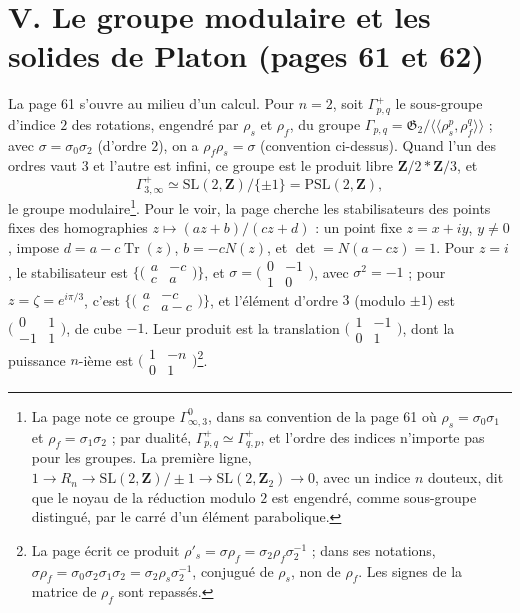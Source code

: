 \documentclass[11pt,a4paper]{article}
\begin{document}
\section*{V. Le groupe modulaire et les solides de Platon (pages 61 et 62)}

La page 61 s'ouvre au milieu d'un calcul. Pour $n = 2$, soit $\Gamma^+_{p,q}$
le sous-groupe d'indice $2$ des rotations, engendré par $\rho_s$ et $\rho_f$, du
groupe $\Gamma_{p,q} = \mathfrak{G}_2 / \langle\langle \rho_s^p, \rho_f^q
\rangle\rangle$ ; avec $\sigma = \sigma_0\sigma_2$ (d'ordre $2$), on a $\rho_f\rho_s
= \sigma$ (convention ci-dessus). Quand l'un des ordres vaut $3$ et l'autre est
infini, ce groupe est le produit libre $\mathbf{Z}/2 * \mathbf{Z}/3$, et
\[
\Gamma^+_{3,\infty} \simeq \mathrm{SL}(2, \mathbf{Z}) / \{\pm 1\} =
\mathrm{PSL}(2, \mathbf{Z}),
\]
le groupe modulaire\footnote{La page note ce groupe $\Gamma^0_{\infty,3}$, dans
sa convention de la page 61 où $\rho_s = \sigma_0\sigma_1$ et $\rho_f =
\sigma_1\sigma_2$ ; par dualité, $\Gamma^+_{p,q} \simeq \Gamma^+_{q,p}$, et l'ordre
des indices n'importe pas pour les groupes. La première ligne, $1 \to R_n \to
\mathrm{SL}(2, \mathbf{Z})/\pm 1 \to \mathrm{SL}(2, \mathbf{Z}_2) \to 0$, avec un
indice $n$ douteux, dit que le noyau de la réduction modulo $2$ est engendré,
comme sous-groupe distingué, par le carré d'un élément parabolique.}. Pour le
voir, la page cherche les stabilisateurs des points fixes des homographies
$z \mapsto (az + b)/(cz + d)$ : un point fixe $z = x + iy$, $y \neq 0$, impose
$d = a - c\operatorname{Tr}(z)$, $b = -cN(z)$, et $\det = N(a - cz) = 1$. Pour $z =
i$, le stabilisateur est $\{\bigl(\begin{smallmatrix} a & -c \\ c & a
\end{smallmatrix}\bigr)\}$, et $\sigma = \bigl(\begin{smallmatrix} 0 & -1 \\ 1 &
0 \end{smallmatrix}\bigr)$, avec $\sigma^2 = -1$ ; pour $z = \zeta = e^{i\pi/3}$,
c'est $\{\bigl(\begin{smallmatrix} a & -c \\ c & a - c
\end{smallmatrix}\bigr)\}$, et l'élément d'ordre $3$ (modulo $\pm 1$) est
$\bigl(\begin{smallmatrix} 0 & 1 \\ -1 & 1 \end{smallmatrix}\bigr)$, de cube
$-1$. Leur produit est la translation $\bigl(\begin{smallmatrix} 1 & -1 \\ 0 & 1
\end{smallmatrix}\bigr)$, dont la puissance $n$-ième est $\bigl(\begin{smallmatrix}
1 & -n \\ 0 & 1 \end{smallmatrix}\bigr)$\footnote{La page écrit ce produit
$\rho'_s = \sigma\rho_f = \sigma_2\rho_f\sigma_2^{-1}$ ; dans ses notations,
$\sigma\rho_f = \sigma_0\sigma_2\sigma_1\sigma_2 = \sigma_2\rho_s\sigma_2^{-1}$,
conjugué de $\rho_s$, non de $\rho_f$. Les signes de la matrice de $\rho_f$ sont
repassés.}.
\end{document}
